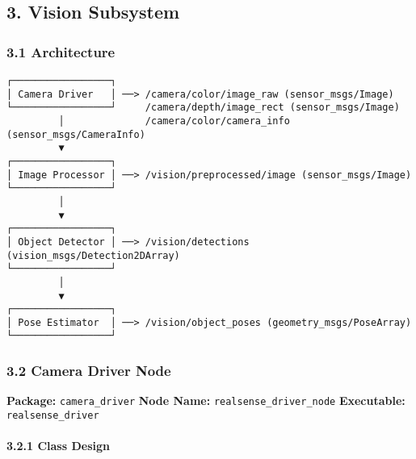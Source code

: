 \documentclass[
]{article}
\begin{document}
\hypertarget{vision-subsystem}{%
\subsection{3. Vision Subsystem}\label{vision-subsystem}}

\hypertarget{architecture}{%
\subsubsection{3.1 Architecture}\label{architecture}}

\begin{verbatim}
┌─────────────────┐
│ Camera Driver   │ ──> /camera/color/image_raw (sensor_msgs/Image)
└─────────────────┘     /camera/depth/image_rect (sensor_msgs/Image)
         │              /camera/color/camera_info (sensor_msgs/CameraInfo)
         ▼
┌─────────────────┐
│ Image Processor │ ──> /vision/preprocessed/image (sensor_msgs/Image)
└─────────────────┘
         │
         ▼
┌─────────────────┐
│ Object Detector │ ──> /vision/detections (vision_msgs/Detection2DArray)
└─────────────────┘
         │
         ▼
┌─────────────────┐
│ Pose Estimator  │ ──> /vision/object_poses (geometry_msgs/PoseArray)
└─────────────────┘
\end{verbatim}

\hypertarget{camera-driver-node}{%
\subsubsection{3.2 Camera Driver Node}\label{camera-driver-node}}

\textbf{Package:} \texttt{camera\_driver} \textbf{Node Name:}
\texttt{realsense\_driver\_node} \textbf{Executable:}
\texttt{realsense\_driver}

\hypertarget{class-design}{%
\paragraph{3.2.1 Class Design}\label{class-design}}
\end{document}
